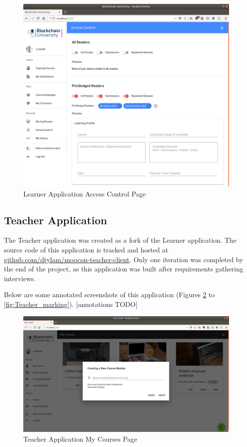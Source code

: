 \begin{figure}[!ht]
	\centering
	\includegraphics[width=1.0\textwidth]{Learner_AC}
	\caption[Learner Application Access Control Page]
	{Learner Application Access Control Page}
	\label{fig:Learner_AC}
\end{figure}

\clearpage
\subsection{Teacher Application}

The Teacher application was created as a fork of the Learner application. 
The source code of this application is tracked and hosted at 
\href{https://github.com/dtylam/moocon-teacher-client}{\underline{github.com/dtylam/moocon-teacher-client}}.
Only one iteration was completed by the end of the project, as this application was built after requirements gathering interviews.

Below are some annotated screenshots of this application (Figures \ref{fig:Teacher_createcourse} to 
\ref{fig:Teacher_marking}). [annotations TODO]

\begin{figure}[!ht]
	\centering
	\includegraphics[width=1.0\textwidth]{Teacher_createcourse}
	\caption[Teacher Application My Courses Page]
	{Teacher Application My Courses Page}
	\label{fig:Teacher_createcourse}
\end{figure}

